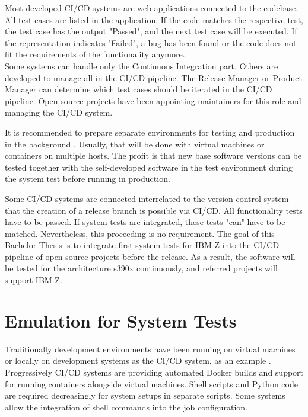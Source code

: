 Most developed \gls{CI/CD} systems are web applications connected to the codebase. All test cases are listed in the application. If the code matches the respective test, the test case has the output "Passed", and the next test case will be executed. If the representation indicates "Failed", a bug has been found or the code does not fit the requirements of the functionality anymore. \\
Some systems can handle only the Continuous Integration part. Others are developed to manage all in the \gls{CI/CD} pipeline.
The Release Manager or Product Manager can determine which test cases should be iterated in the \gls{CI/CD} pipeline. Open-source projects have been appointing maintainers for this role and managing the \gls{CI/CD} system.

It is recommended to prepare separate environments for testing and production in the background \cite[~p.120]{Scholl2019}. 
Usually, that will be done with virtual machines or containers on multiple hosts. The profit is that new base software versions can be tested together with the self-developed software in the test environment during the system test before running in production.

Some \gls{CI/CD} systems are connected interrelated to the version control system that the creation of a release branch is possible via \gls{CI/CD}. All functionality tests have to be passed.  If system tests are integrated, these tests "can" have to be matched. Nevertheless, this proceeding is no requirement. The goal of this Bachelor Thesis is to integrate first system tests for IBM Z into the \gls{CI/CD} pipeline of open-source projects before the release. As a result, the software will be tested for the architecture s390x continuously, and referred projects will support IBM Z.

\section{Emulation for System Tests}

Traditionally development environments have been running on virtual machines or locally on development systems as the \gls{CI/CD} system, as an example \cite[~p.123]{Scholl2019}. Progressively \gls{CI/CD} systems are providing automated Docker builds and support for running containers alongside virtual machines. 
Shell scripts and Python code are required decreasingly for system setups in separate scripts. Some systems allow the integration of shell commands into the job configuration.

